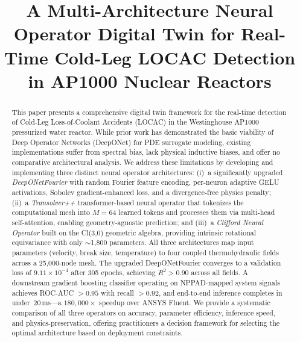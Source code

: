 \documentclass[conference]{IEEEtran}
\begin{document}
\title{A Multi-Architecture Neural Operator Digital Twin for Real-Time Cold-Leg LOCAC Detection in AP1000 Nuclear Reactors}

\author{
}

\maketitle

\begin{abstract}
This paper presents a comprehensive digital twin framework for the real-time detection of Cold-Leg Loss-of-Coolant Accidents (LOCAC) in the Westinghouse AP1000 pressurized water reactor. While prior work has demonstrated the basic viability of Deep Operator Networks (DeepONet) for PDE surrogate modeling, existing implementations suffer from spectral bias, lack physical inductive biases, and offer no comparative architectural analysis. We address these limitations by developing and implementing three distinct neural operator architectures: (i)~a significantly upgraded \emph{DeepONetFourier} with random Fourier feature encoding, per-neuron adaptive GELU activations, Sobolev gradient-enhanced loss, and a divergence-free physics penalty; (ii)~a \emph{Transolver++} transformer-based neural operator that tokenizes the computational mesh into $M=64$ learned tokens and processes them via multi-head self-attention, enabling geometry-agnostic prediction; and (iii)~a \emph{Clifford Neural Operator} built on the Cl(3,0) geometric algebra, providing intrinsic rotational equivariance with only $\sim$1,800 parameters. All three architectures map input parameters (velocity, break size, temperature) to four coupled thermohydraulic fields across a 25,000-node mesh. The upgraded DeepONetFourier converges to a validation loss of $9.11\times10^{-4}$ after 305 epochs, achieving $R^2 > 0.90$ across all fields. A downstream gradient boosting classifier operating on NPPAD-mapped system signals achieves ROC-AUC $> 0.95$ with recall $> 0.92$, and end-to-end inference completes in under~20\,ms---a $180{,}000\times$ speedup over ANSYS Fluent. We provide a systematic comparison of all three operators on accuracy, parameter efficiency, inference speed, and physics-preservation, offering practitioners a decision framework for selecting the optimal architecture based on deployment constraints.
\end{abstract}
\end{document}
